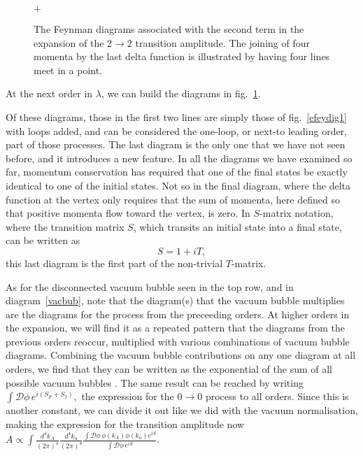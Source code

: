 \begin{figure}[htp]
\begin{footnotesize}
\vspace{.5em}

\begin{minipage}{.09\textwidth}
\normalsize $+$
\end{minipage}
\begin{minipage}{.9\textwidth}
\begin{center}
\end{center}
\end{minipage}

\end{footnotesize}
\caption{The Feynman diagrams associated with the second term in the expansion of the $2\rightarrow2$ transition amplitude. The joining of four momenta by the last delta function is illustrated by having four lines meet in a point.
\label{efeydig2}}
\end{figure}

At the next order in $\lambda$, we can build the diagrams in fig.~\ref{efeydig2}.

Of these diagrams, those in the first two lines are simply those of fig.~\ref{efeydig1} with loops added, and can be considered the one-loop, or next-to leading order, part of those processes.
 The last diagram is the only one that we have not seen before, and it introduces a new feature. In all the diagrams we have examined so far, momentum conservation has required that one of the final states be exactly identical to one of the initial states. Not so in the final diagram, where the delta function at the vertex only requires that the sum of momenta, here defined so that positive momenta flow toward the vertex, is zero. In $S$-matrix notation, where the transition matrix $S$, which transits an initial state into a final state, can be written as
\[S=1+iT,\]
this last diagram is the first part of the non-trivial $T$-matrix.

As for the disconnected vacuum bubble seen in the top row, and in diagram~\eqref{vacbub}, note that the diagram(s) that the vacuum bubble multiplies are the diagrams for the process from the preceeding orders. At higher orders in the expansion, we will find it as a repeated pattern that the diagrams from the previous orders reoccur, multiplied with various combinations of vacuum bubble diagrams. Combining the vacuum bubble contributions on any one diagram at all orders, we find that they can be written as the exponential of the sum of all possible vacuum bubbles \cite{sred:freediagexp}. The same result can be reached by writing
\(\int\mathcal D\phi\,e^{i(S_F+S_I)},\)
the expression for the $0\rightarrow0$ process to all orders. Since this is another constant, we can divide it out like we did with the vacuum normalisation, making the expression for the transition amplitude now
\(A\propto\int\frac{d^4k_A}{(2\pi)^4}\frac{d^4k_a}{(2\pi)^4}\frac{\int\mathcal D\phi\,\phi(k_A)\phi(k_a)e^{iS}}{\int\mathcal D\phi\,e^{iS}}.\)

